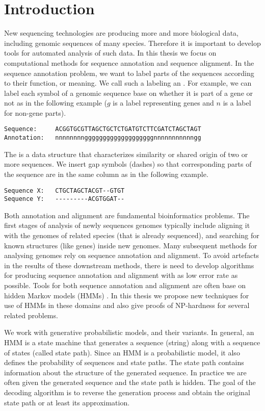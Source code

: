 \chapter{Introduction}

New sequencing technologies are producing more and more biological data,
including genomic sequences of many species. Therefore it is important to
develop tools for automated analysis of such data. In this thesis we focus on
computational methods for sequence annotation and sequence alignment.  In the
sequence annotation problem, we want to label parts of the sequences according
to their function, or meaning. We call
such a labeling an . For example,  we 
can label each symbol of a genomic sequence base on whether it is part of a
gene or not as in the following example ($g$ is a label representing genes and $n$ is a label for non-gene parts).
\begin{verbatim}
Sequence:     ACGGTGCGTTAGCTGCTCTGATGTCTTCGATCTAGCTAGT 
Annotation:   nnnnnnnngggggggggggggggggggnnnnnnnnnnngg
\end{verbatim}
The  is a data structure
that characterizes similarity or shared origin of two or more sequences.
We insert gap symbols (dashes) so that corresponding parts of the sequence are in the same column as in the following
example.
\begin{verbatim}
Sequence X:   CTGCTAGCTACGT--GTGT
Sequence Y:   ---------ACGTGGAT--
\end{verbatim}
Both annotation and alignment are fundamental bioinformatics problems. 
The first stages of analysis of newly 
sequences genomes typically include aligning it with the genomes of related 
species (that is already sequenced), and searching for known structures (like genes) inside
new genomes.
Many subsequent methods for analysing genomes rely on sequence
annotation and alignment. To avoid artefacts in the results of
these downstream methods, there is need to develop algorithms for producing sequence
annotation and alignment with as low error rate as possible.
Tools for both
sequence annotation and alignment are often base on hidden Markov models (HMMs)
\cite{Durbin1998,Alexanderson2004,Brejova2005, FEAST2011,Krogh2001,Majoros2005,
Meyer2002,Nanasi2010,Pairagon2009, Schultz2006,Kovac2012,Pachter2002,
Liu2010,Brown2010, Lunter2008}.  In this thesis we propose new techniques for
use of HMMs  in these domains and also give proofs of NP-hardness for several related problems.

We work with generative probabilistic models,  and their variants. In general, an HMM is a state machine that
generates a sequence (string) along with a sequence of states (called state path).
Since an HMM is a probabilistic model,
it also defines the probability of sequences and state paths. The state
path contains information about the structure of the generated sequence. In
practice we are often given the generated sequence and the state path is hidden. The
goal of the decoding algorithm is to reverse the generation process and obtain
the original state path or at least its approximation.

